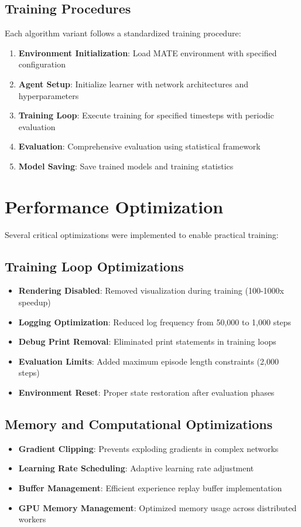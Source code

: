 \documentclass[12pt,a4paper]{report}
\begin{document}
\subsection{Training Procedures}
Each algorithm variant follows a standardized training procedure:

\begin{enumerate}
\item \textbf{Environment Initialization}: Load MATE environment with specified configuration
\item \textbf{Agent Setup}: Initialize learner with network architectures and hyperparameters
\item \textbf{Training Loop}: Execute training for specified timesteps with periodic evaluation
\item \textbf{Evaluation}: Comprehensive evaluation using statistical framework
\item \textbf{Model Saving}: Save trained models and training statistics
\end{enumerate}

\section{Performance Optimization}
Several critical optimizations were implemented to enable practical training:

\subsection{Training Loop Optimizations}
\begin{itemize}
\item \textbf{Rendering Disabled}: Removed visualization during training (100-1000x speedup)
\item \textbf{Logging Optimization}: Reduced log frequency from 50,000 to 1,000 steps
\item \textbf{Debug Print Removal}: Eliminated print statements in training loops
\item \textbf{Evaluation Limits}: Added maximum episode length constraints (2,000 steps)
\item \textbf{Environment Reset}: Proper state restoration after evaluation phases
\end{itemize}

\subsection{Memory and Computational Optimizations}
\begin{itemize}
\item \textbf{Gradient Clipping}: Prevents exploding gradients in complex networks
\item \textbf{Learning Rate Scheduling}: Adaptive learning rate adjustment
\item \textbf{Buffer Management}: Efficient experience replay buffer implementation
\item \textbf{GPU Memory Management}: Optimized memory usage across distributed workers
\end{itemize}
\end{document}
